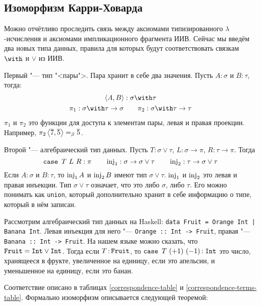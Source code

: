 \subsection{\texorpdfstring{Изоморфизм Карри-Ховарда}{Curry-Howard correspondence}}

Можно отчётливо проследить связь между аксиомами типизированного $\lambda$-исчисления и аксиомами импликационного фрагмента ИИВ.
Сейчас мы введём два новых типа данных, правила для которых будут соответствовать связкам $\with$ и $\lor$ из ИИВ.

Первый "--- тип "<пары">. Пара хранит в себе два значения. Пусть $A : \sigma$ и $B : \tau$, тогда:
\begin{gather*}
    \pair{A,B} : \sigma \with \tau \\
    \pi_1 : \sigma\with\tau\rightarrow\sigma \qquad \pi_2 : \sigma\with\tau\rightarrow\tau
\end{gather*}
$\pi_1$ и $\pi_2$ это функции для доступа к элементам пары, левая и правая проекции.
Например, $\pi_2 \left<\overline 7,\overline 5\right> =_\beta \overline 5$.

Второй "--- алгебраический тип данных. Пусть $T : \sigma\vee\tau$, $L : \sigma\rightarrow\pi$, $R : \tau\rightarrow\pi$. Тогда
\[
    \mathinner{\mathtt{case}}~T~L~R : \pi \qquad \operatorname{inj}_1 : \sigma\rightarrow\sigma\vee\tau \qquad \operatorname{inj}_2 : \tau\rightarrow\sigma\vee\tau
\]
Если $A : \sigma$ и $B : \tau$, то $\operatorname{inj}_1 A$ и $\operatorname{inj}_2 B$ имеют тип $\sigma\vee\tau$.
$\operatorname{inj}_1$ и $\operatorname{inj}_2$ это левая и правая инъекции.
Тип $\sigma \vee \tau$ означает, что это либо $\sigma$, либо $\tau$.
Его можно понимать как \texttt{union}, который дополнительно хранит в себе информацию о типе, который в нём записан.

Рассмотрим алгебраический тип данных на Haskell: \texttt{data Fruit = Orange Int | Banana Int}. Левая инъекция для него "---
\texttt{Orange :: Int -> Fruit}, правая "--- \texttt{Banana :: Int -> Fruit}.
На нашем языке можно сказать, что $\mathinner\mathtt{Fruit} = \mathinner{\mathtt{Int}} \vee \mathinner{\mathtt{Int}}$.
Тогда если $T \mathinner{:} \mathtt{Fruit}$, то $\mathinner{\mathtt{case}}~T~(+1)~(-1) \mathinner{:} \mathrel{\mathtt{Int}}$ это число,
хранящееся в фрукте, увеличенное на единицу, если это апельсин, и уменьшенное на единицу, если это банан.

Соответствие описано в таблицах \ref{correspondence-table} и \ref{correspondence-terms-table}.
Формально изоморфизм описывается следующей теоремой:

